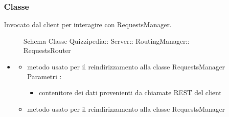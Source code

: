 \subsubsection{Classe }
Invocato dal client per interagire con RequestsManager.
\begin{figure}[H]
\centering
\noindent{}
\caption[Schema Classe RequestsRouter]{Schema Classe Quizzipedia:: Server:: RoutingManager:: RequestsRouter}
\end{figure}
\begin{itemize}
\item {}
\begin{itemize}
\item {}
\newline
metodo usato per il reindirizzamento alla classe RequestsManager
\newline
Parametri :
\begin{itemize}
\item {}
\newline
contenitore dei dati provenienti da chiamate REST del client
\end{itemize}
\item {}
\newline
metodo usato per il reindirizzamento alla classe RequestsManager
\newline
\end{itemize}
\end{itemize}
